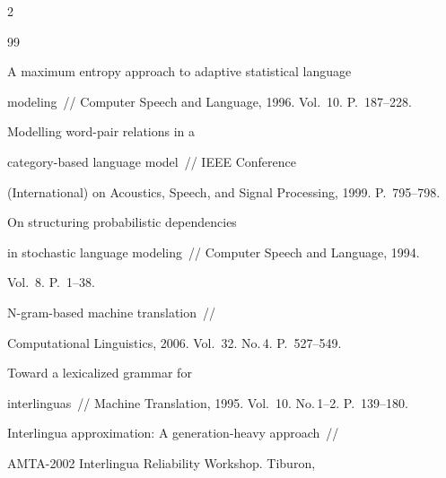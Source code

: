 \begin{multicols}{2}
{{\begin{thebibliography}{99}




A maximum entropy approach to adaptive statistical language


modeling~// Computer Speech and Language, 1996. Vol.~10. P.~187--228.









Modelling word-pair relations in a


category-based language model~// IEEE Conference


(International) on Acoustics, Speech, and Signal Processing, 1999. P.~795--798.









On structuring probabilistic dependencies


in stochastic language modeling~// Computer Speech and Language, 1994.


Vol.~8. P.~1--38.









 N-gram-based machine translation~//


Computational Linguistics, 2006. Vol.~32. No.\,4. P.~527--549.









Toward a lexicalized grammar for


interlinguas~// Machine Translation, 1995. Vol.~10. No.\,1--2. P.~139--180.









Interlingua approximation: A generation-heavy approach~//


AMTA-2002 Interlingua Reliability Workshop. Tiburon,



\end{thebibliography}}}
\end{multicols}
